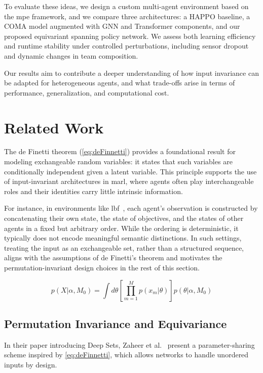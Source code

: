 \documentclass{article}
\begin{document}
To evaluate these ideas, we design a custom multi-agent 
environment based on the \gls{mpe} framework, and we compare three architectures: 
a HAPPO baseline, a COMA model augmented with GNN and Transformer components, 
and our proposed equivariant spanning policy network. 
We assess both learning efficiency and runtime stability 
under controlled perturbations, including sensor dropout 
and dynamic changes in team composition.

Our results aim to contribute a deeper understanding of how 
input invariance can be adapted for heterogeneous agents, 
and what trade-offs arise in terms of performance, 
generalization, and computational cost.

\section{Related Work}

The de Finetti theorem (\cref{eq:deFinnetti}) provides a foundational 
result for modeling exchangeable random variables: it states that 
such variables are conditionally independent given a latent variable. 
This principle supports the use of input-invariant architectures in 
\gls{marl}, where agents often play interchangeable roles and their 
identities carry little intrinsic information.

For instance, in environments like \gls{lbf}~\cite{papoudakis2021}, 
each agent's observation is constructed by concatenating their own state, 
the state of objectives, and the states of other agents in a fixed but arbitrary order. 
While the ordering is deterministic, it typically does not encode meaningful 
semantic distinctions. In such settings, treating the input as an exchangeable set,
rather than a structured sequence, aligns with the assumptions of de Finetti's theorem 
and motivates the permutation-invariant design choices in the rest of this section.

\begin{equation}
    p(X|\alpha,M_0) =\int d\theta \left[ \prod_{m=1}^{M} p(x_m|\theta)\right]p(\theta|\alpha,M_0)
    \label{eq:deFinnetti}
\end{equation}


\subsection{Permutation Invariance and Equivariance}

In their paper introducing Deep Sets, Zaheer et al.~\cite{zaheer2017} 
present a parameter-sharing scheme inspired by \cref{eq:deFinnetti}, 
which allows networks to handle unordered inputs by design.
\end{document}

